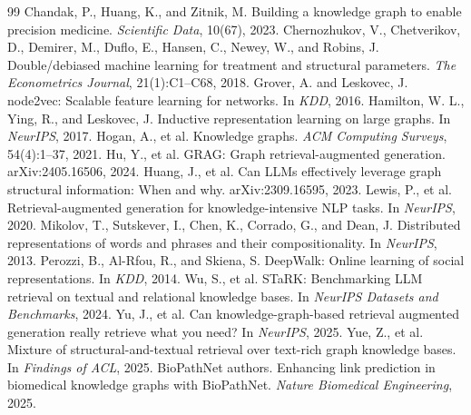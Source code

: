 \documentclass{article}
\theoremstyle{plain}
\theoremstyle{definition}
\theoremstyle{remark}
\begin{document}

\begin{thebibliography}{99}
 Chandak, P., Huang, K., and Zitnik, M. \newblock Building a knowledge graph to enable precision medicine. \newblock \emph{Scientific Data}, 10(67), 2023.
 Chernozhukov, V., Chetverikov, D., Demirer, M., Duflo, E., Hansen, C., Newey, W., and Robins, J. \newblock Double/debiased machine learning for treatment and structural parameters. \newblock \emph{The Econometrics Journal}, 21(1):C1--C68, 2018.
 Grover, A. and Leskovec, J. \newblock node2vec: Scalable feature learning for networks. \newblock In \emph{KDD}, 2016.
 Hamilton, W. L., Ying, R., and Leskovec, J. \newblock Inductive representation learning on large graphs. \newblock In \emph{NeurIPS}, 2017.
 Hogan, A., et al. \newblock Knowledge graphs. \newblock \emph{ACM Computing Surveys}, 54(4):1--37, 2021.
 Hu, Y., et al. \newblock GRAG: Graph retrieval-augmented generation. \newblock arXiv:2405.16506, 2024.
 Huang, J., et al. \newblock Can LLMs effectively leverage graph structural information: When and why. \newblock arXiv:2309.16595, 2023.
 Lewis, P., et al. \newblock Retrieval-augmented generation for knowledge-intensive NLP tasks. \newblock In \emph{NeurIPS}, 2020.
 Mikolov, T., Sutskever, I., Chen, K., Corrado, G., and Dean, J. \newblock Distributed representations of words and phrases and their compositionality. \newblock In \emph{NeurIPS}, 2013.
 Perozzi, B., Al-Rfou, R., and Skiena, S. \newblock DeepWalk: Online learning of social representations. \newblock In \emph{KDD}, 2014.
 Wu, S., et al. \newblock STaRK: Benchmarking LLM retrieval on textual and relational knowledge bases. \newblock In \emph{NeurIPS Datasets and Benchmarks}, 2024.
 Yu, J., et al. \newblock Can knowledge-graph-based retrieval augmented generation really retrieve what you need? \newblock In \emph{NeurIPS}, 2025.
 Yue, Z., et al. \newblock Mixture of structural-and-textual retrieval over text-rich graph knowledge bases. \newblock In \emph{Findings of ACL}, 2025.
 BioPathNet authors. \newblock Enhancing link prediction in biomedical knowledge graphs with BioPathNet. \newblock \emph{Nature Biomedical Engineering}, 2025.

\end{thebibliography}
\end{document}
